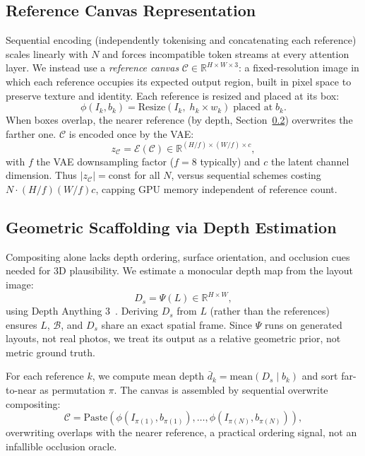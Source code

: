 \subsection{Reference Canvas Representation}
\label{sec:canvas}
Sequential encoding (independently tokenising and concatenating each reference) scales linearly with $N$ and forces incompatible token streams at every attention layer.
We instead use a \emph{reference canvas} $\mathcal{C} \in \mathbb{R}^{H \times W \times 3}$: a fixed-resolution image in which each reference occupies its expected output region, built in pixel space to preserve texture and identity.
Each reference is resized and placed at its box:
\begin{equation}
  \phi(I_k, b_k) = \mathrm{Resize}(I_k,\; h_k \times w_k)\;\text{placed at}\; b_k.
\end{equation}
When boxes overlap, the nearer reference (by depth, Section~\ref{sec:depth}) overwrites the farther one.
$\mathcal{C}$ is encoded once by the VAE:
\begin{equation}
  z_{\mathcal{C}} = \mathcal{E}(\mathcal{C}) \in \mathbb{R}^{(H/f) \times (W/f) \times c},
\end{equation}
with $f$ the VAE downsampling factor ($f=8$ typically) and $c$ the latent channel dimension.
Thus $|z_{\mathcal{C}}| = \text{const}$ for all $N$, versus sequential schemes costing $N \cdot (H/f)(W/f)c$, capping GPU memory independent of reference count.

\subsection{Geometric Scaffolding via Depth Estimation}
\label{sec:depth}
Compositing alone lacks depth ordering, surface orientation, and occlusion cues needed for 3D plausibility. We estimate a monocular depth map from the layout image:
\begin{equation}
  D_s = \Psi(L) \in \mathbb{R}^{H \times W},
\end{equation}
using Depth Anything 3~\cite{depthanything3}. Deriving $D_s$ from $L$ (rather than the references) ensures $L$, $\mathcal{B}$, and $D_s$ share an exact spatial frame. Since $\Psi$ runs on generated layouts, not real photos, we treat its output as a relative geometric prior, not metric ground truth.

For each reference $k$, we compute mean depth $\bar{d}_k = \mathrm{mean}(D_s \mid b_k)$ and sort far-to-near as permutation $\pi$. The canvas is assembled by sequential overwrite compositing:
\begin{equation}
  \mathcal{C} =
  \mathrm{Paste}\!\left(
    \phi(I_{\pi(1)}, b_{\pi(1)}), \ldots,
    \phi(I_{\pi(N)}, b_{\pi(N)})
  \right),
\end{equation}
overwriting overlaps with the nearer reference, a practical ordering signal, not an infallible occlusion oracle.

